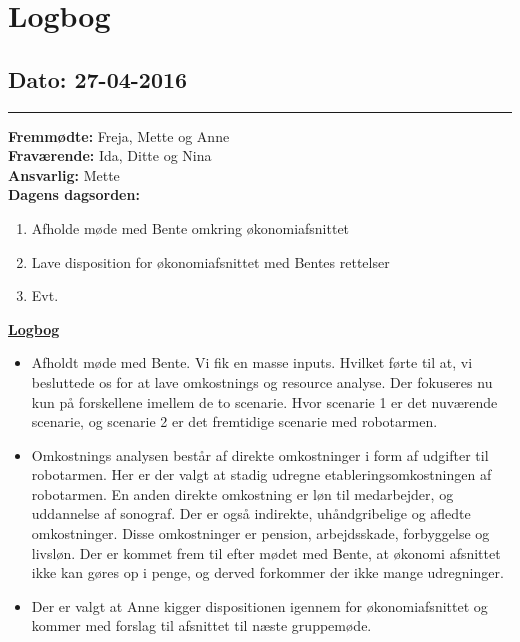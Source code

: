 \chapter{Logbog}
\section{Dato: 27-04-2016}
\hrule
\textbf{Fremmødte:} Freja, Mette og Anne \\
\textbf{Fraværende: } Ida, Ditte og Nina \\
\textbf{Ansvarlig: }Mette \\
\textbf{Dagens dagsorden: }
\begin{enumerate}
	\item Afholde møde med Bente omkring økonomiafsnittet
	\item Lave disposition for økonomiafsnittet med Bentes rettelser
	\item Evt. 
\end{enumerate}

\underline{\textbf{Logbog}}
\begin{itemize}
\item Afholdt møde med Bente. Vi fik en masse inputs. Hvilket førte til at, vi besluttede os for at lave omkostnings og resource analyse. Der fokuseres nu kun på forskellene imellem de to scenarie. Hvor scenarie 1 er det nuværende scenarie, og scenarie 2 er det fremtidige scenarie med robotarmen.
\item Omkostnings analysen består af direkte omkostninger i form af udgifter til robotarmen. Her er der valgt at stadig udregne etableringsomkostningen af robotarmen. En anden direkte omkostning er løn til medarbejder, og uddannelse af sonograf. Der er også indirekte, uhåndgribelige og afledte omkostninger. Disse omkostninger er pension, arbejdsskade, forbyggelse og livsløn. Der er kommet frem til efter mødet med Bente, at økonomi afsnittet ikke kan gøres op i penge, og derved forkommer der ikke mange udregninger. 
\item Der er valgt at Anne kigger dispositionen igennem for økonomiafsnittet og kommer med forslag til afsnittet til næste gruppemøde. \\

\end{itemize}
